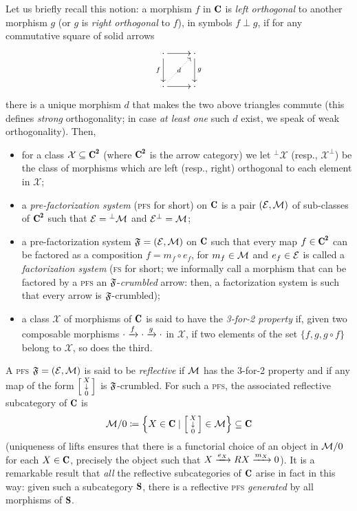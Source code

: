 Let us briefly recall this notion: a morphism $f$ in $\C$ is \emph{left orthogonal} to another morphism $g$ (or $g$ is \emph{right orthogonal} to $f$), in symbols $f\perp g$, if for any commutative square of solid arrows
\[
\xymatrix{
\cdot\ar[r]\ar[d]_f&\cdot\ar[d]^g\\
\cdot\ar[r]\ar@{.>}[ur]|{\ d\ }&\cdot
}
\]
there is a unique morphism $d$ that makes the two above triangles commute (this defines \emph{strong} orthogonality; in case \emph{at least one} such $d$ exist, we speak of weak orthogonality). Then,
\begin{itemize}%
\item for a class $\mathcal X\subseteq \C^\due$ (where $\C^\due$ is the arrow category) we let ${}^{\perp}\mathcal X$ (resp., $\mathcal X^{\perp}$) be the class of morphisms which are left (resp., right) orthogonal to each element in $\mathcal X$;
\item a \emph{pre-factorization system} (\textsc{pfs} for short) on $\C$ is a pair $(\mathcal{E},\mathcal{M})$ of sub-classes of $\C^\due$ such that $\mathcal{E}={}^{\perp}\mathcal{M}$ and $\mathcal{E}^{\perp}=\mathcal{M}$;
\item a pre-factorization system $\mathfrak{F}=(\mathcal{E},\mathcal{M})$ on $\C$ such that every map $f\in \C^\due$ can be factored as a composition $f=m_f\circ e_f$, for $m_f\in \mathcal{M}$ and $e_f\in \mathcal{E}$ is called a \emph{factorization system} (\textsc{fs} for short; we informally call a morphism that can be factored by a \textsc{pfs} an $\mathfrak{F}$-\emph{crumbled} arrow: then, a factorization system is such that every arrow is $\mathfrak{F}$-crumbled);
\item a class $\mathcal X$ of morphisms of $\C$ is said to have the \emph{3-for-2 property} if, given two composable morphisms $\cdot\xrightarrow{f}\cdot\xrightarrow{g}\cdot$ in $\mathcal X$, if two elements of the set $\{f,g,g\circ f\}$ belong to $\mathcal X$, so does the third.
\end{itemize}
A \textsc{pfs} $\mathfrak{F}=(\mathcal{E},\mathcal{M})$ is said to be \emph{reflective} if $\mathcal{M}$ has the 3-for-2 property and if any map of the form $\left[ \begin{smallmatrix} X \\ \downarrow \\ 0 \end{smallmatrix}\right]$ is $\mathfrak{F}$-crumbled. For such a \textsc{pfs}, the associated reflective subcategory of $\C$ is
\[
\M/0 \coloneqq \left\{X\in \C \mid \var{X}{0}\in \M\right\}\subseteq \C
\]
(uniqueness of lifts ensures that there is a functorial choice of an object in $\mathcal{M}/0$ for each $X\in \C$, precisely the object such that $X \xrightarrow{e_X} RX \xrightarrow{m_X} 0$). It is a remarkable result that \emph{all} the reflective subcategories of $\C$ arise in fact in this way: given such a subcategory $\cate{S}$, there is a reflective \textsc{pfs} \emph{generated} by all morphisms of $\cate{S}$.

